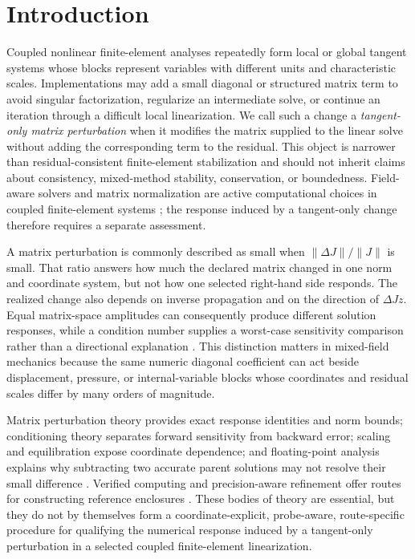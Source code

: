 \documentclass[preprint,12pt]{elsarticle}
\begin{document}
\section{Introduction}

Coupled nonlinear finite-element analyses repeatedly form local or global tangent systems whose blocks represent variables with different units and characteristic scales. Implementations may add a small diagonal or structured matrix term to avoid singular factorization, regularize an intermediate solve, or continue an iteration through a difficult local linearization. We call such a change a \emph{tangent-only matrix perturbation} when it modifies the matrix supplied to the linear solve without adding the corresponding term to the residual. This object is narrower than residual-consistent finite-element stabilization and should not inherit claims about consistency, mixed-method stability, conservation, or boundedness. Field-aware solvers and matrix normalization are active computational choices in coupled finite-element systems \cite{S17,S20,S29,S30}; the response induced by a tangent-only change therefore requires a separate assessment.

A matrix perturbation is commonly described as small when $\lVert\Delta J\rVert/\lVert J\rVert$ is small. That ratio answers how much the declared matrix changed in one norm and coordinate system, but not how one selected right-hand side responds. The realized change also depends on inverse propagation and on the direction of $\Delta Jz$. Equal matrix-space amplitudes can consequently produce different solution responses, while a condition number supplies a worst-case sensitivity comparison rather than a directional explanation \cite{S01,S02,S03}. This distinction matters in mixed-field mechanics because the same numeric diagonal coefficient can act beside displacement, pressure, or internal-variable blocks whose coordinates and residual scales differ by many orders of magnitude.

Matrix perturbation theory provides exact response identities and norm bounds; conditioning theory separates forward sensitivity from backward error; scaling and equilibration expose coordinate dependence; and floating-point analysis explains why subtracting two accurate parent solutions may not resolve their small difference \cite{S02,S03,S05,S06,S08,S09,S10,S11}. Verified computing and precision-aware refinement offer routes for constructing reference enclosures \cite{S12,S13,S28}. These bodies of theory are essential, but they do not by themselves form a coordinate-explicit, probe-aware, route-specific procedure for qualifying the numerical response induced by a tangent-only perturbation in a selected coupled finite-element linearization.
\end{document}
